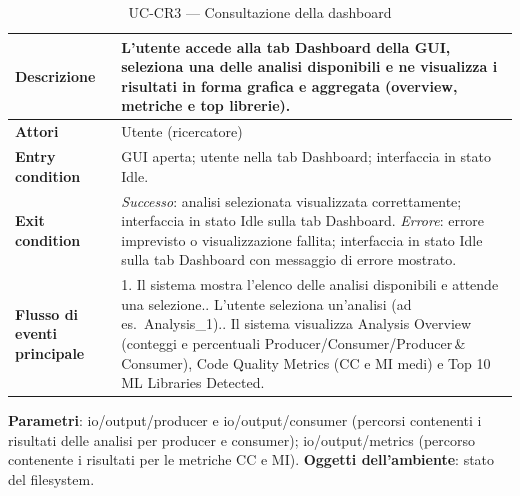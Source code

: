\documentclass[11pt,a4paper]{article}
\makeatletter
\newif\ifmark@prevlower
\def\mark@casebreak#1{%
  \ifcat\noexpand#1\relax
    \mark@prevlowerfalse
  \else
    \ifnum`#1=\uccode`#1\relax
      \ifmark@prevlower\allowbreak\fi
      \mark@prevlowerfalse
    \else
      \ifnum`#1=\lccode`#1\relax
        \mark@prevlowertrue
      \else
        \mark@prevlowerfalse
      \fi
    \fi
  \fi}
\def\mark@brk#1{%
  \ifx#1\mark@stop
    \let\mark@next\relax
  \else
    \mark@casebreak{#1}%
    #1%
    \ifx#1.\allowbreak\else
      \ifx#1\_\allowbreak\else
        \ifx#1/\allowbreak\else
          \ifx#1(\allowbreak\fi
        \fi
      \fi
    \fi
    \let\mark@next\mark@brk
  \fi
  \mark@next}
\def\mark@stop{\mark@stop}
\DeclareRobustCommand{\mark@code}[1]{%
  \ifmmode
    \text{\ttfamily\small\mark@prevlowerfalse\mark@brk#1\mark@stop}%
  \else
    {\ttfamily\small\mark@prevlowerfalse\mark@brk#1\mark@stop}%
  \fi}
\DeclareRobustCommand{\code}[1]{\mark@code{#1}}
\DeclareRobustCommand{\pkgpath}[1]{\mark@code{#1}}
\def\mark@code#1{#1}%
\def\code#1{#1}%
\def\pkgpath#1{#1}%
\newcommand{\thead}[1]{\textbf{#1}}
\makeatother
\begin{document}
\begin{table}[H]
  \centering\small
  \caption{UC-CR3 --- Consultazione della dashboard}
  \label{tab:uc-cr3}
  \begin{tabularx}{\linewidth}{@{}L{3.3cm} Y@{}}
    \toprule
    \thead{Descrizione} & L'utente accede alla tab Dashboard della GUI,
      seleziona una delle analisi disponibili e ne visualizza i risultati in
      forma grafica e aggregata (overview, metriche e top librerie).\\
    \midrule
    \thead{Attori} & Utente (ricercatore)\\
    \midrule
    \thead{Entry condition} & GUI aperta; utente nella tab Dashboard;
      interfaccia in stato Idle.\\
    \midrule
    \thead{Exit condition} &
      \emph{Successo}: analisi selezionata visualizzata correttamente;
      interfaccia in stato Idle sulla tab Dashboard.\newline
      \emph{Errore}: errore imprevisto o visualizzazione fallita; interfaccia in
      stato Idle sulla tab Dashboard con messaggio di errore mostrato.\\
    \midrule
    \thead{Flusso di eventi principale} &
      1. Il sistema mostra l'elenco delle analisi disponibili e attende una
         selezione.. L'utente seleziona un'analisi (ad es.\ \code{Analysis\_1}).. Il sistema visualizza Analysis Overview (conteggi e percentuali
         Producer/Consumer/Producer\,\&\,Consumer), Code Quality Metrics
         (CC e MI medi) e Top 10 ML Libraries Detected.\\
    \bottomrule
  \end{tabularx}
\end{table}

\textbf{Parametri}: \pkgpath{io/output/producer} e \pkgpath{io/output/consumer}
(percorsi contenenti i risultati delle analisi per producer e consumer);
\pkgpath{io/output/metrics} (percorso contenente i risultati per le metriche CC
e MI). \quad \textbf{Oggetti dell'ambiente}: stato del filesystem.
\end{document}
